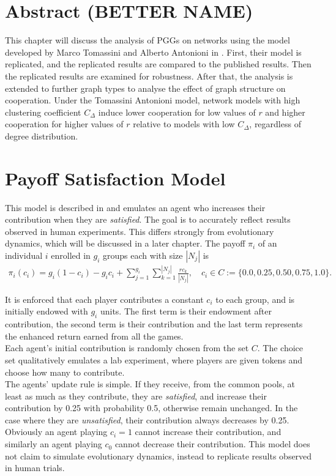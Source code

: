 

\section{Abstract (BETTER NAME)}
This chapter will discuss the analysis of PGGs on networks using the model developed by Marco Tomassini and Alberto Antonioni in \cite{RN49}. First, their model is replicated, and the replicated results are compared to the published results. Then the replicated results are examined for robustness. After that, the analysis is extended to further graph types to analyse the effect of graph structure on cooperation. Under the Tomassini Antonioni model, network models with high clustering coefficient $C_\Delta$ induce lower cooperation for low values of $r$ and higher cooperation for higher values of $r$ relative to models with low $C_\Delta$, regardless of degree distribution. \\

\section{Payoff Satisfaction Model}
This model is described in \cite{RN49} and emulates an agent who increases their contribution when they are \emph{satisfied}. The goal is to accurately reflect results observed in human experiments. This differs strongly from evolutionary dynamics, which will be discussed in a later chapter. The payoff $\pi_i$ of an individual $i$ enrolled in $g_i$ groups each with size $|N_j|$ is \\
\begin{align} 
    \pi_i(c_i) = g_i(1-c_i) - g_ic_i + \sum_{j=1}^{g_i} \sum_{k=1}^{|N_j|} \frac{rc_k}{|N_j|}, \quad c_i \in C:= \{0.0, 0.25, 0.50, 0.75, 1.0\}. 
\end{align}

It is enforced that each player contributes a constant $c_i$ to each group, and is initially endowed with $g_i$ units. The first term is their endowment after contribution, the second term is their contribution and the last term represents the enhanced return earned from all the games. \\

Each agent's initial contribution is randomly chosen from the set $C$. The choice set qualitatively emulates a lab experiment, where players are given tokens and choose how many to contribute. \\

The agents' update rule is simple. If they receive, from the common pools, at least as much as they contribute, they are \emph{satisfied}, and increase their contribution by 0.25 with probability 0.5, otherwise remain unchanged. In the case where they are \emph{unsatisfied}, their contribution always decreases by 0.25. Obviously an agent playing $c_i =1$ cannot increase their contribution, and similarly an agent playing $c_0$ cannot decrease their contribution. This model does not claim to simulate evolutionary dynamics, instead to replicate results observed in human trials. \\


